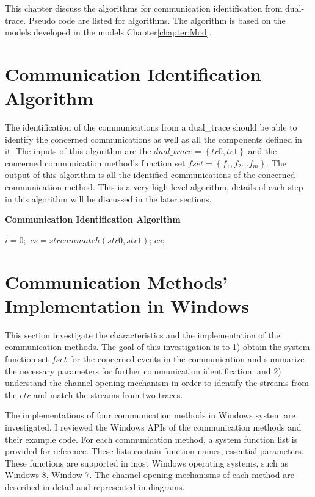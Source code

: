 

\label{chapter:alo}
This chapter discuss the algorithms for communication identification from dual-trace. Pseudo code are listed for algorithms. The algorithm is based on the models developed in the models Chapter\ref{chapter:Mod}.

\section{Communication Identification Algorithm}
The identification of the communications from a dual\_trace should be able to identify the concerned communications as well as all the components defined in it. The inputs of this algorithm are the $dual\_trace=\left\lbrace tr0, tr1 \right\rbrace $ and the concerned communication method's function set $fset = \left \lbrace f_1,f_2...f_m \right\rbrace $. The output of this algorithm is all the identified communications of the concerned communication method. This is a very high level algorithm, details of each step in this algorithm will be discussed in the later sections.\par
\begin{algorithm}[H]
\DontPrintSemicolon
\caption{{\bf Communication Identification Algorithm} \label{endpointIdentAlg}}
$i = 0;$\;
$cs = streammatch(str0, str1)$;\;
\KwRet $cs$;\;
\end{algorithm} 

\section{Communication Methods' Implementation in Windows}\label{windows}
This section investigate the characteristics and the implementation of the communication methods.  The goal of this investigation is to 1) obtain the system function set $fset$ for the concerned events in the communication and summarize the necessary parameters for further communication identification. and 2) understand the channel opening mechanism in order to identify the streams from the $etr$ and match the streams from two traces.

The implementations of four communication methods in Windows system are investigated. I reviewed the Windows APIs of the communication methods and their example code. For each communication method, a system function list is provided for reference. These lists contain function names, essential parameters. These functions are supported in most Windows operating systems, such as Windows 8, Window 7. The channel opening mechanisms of each method are described in detail and represented in diagrams.

